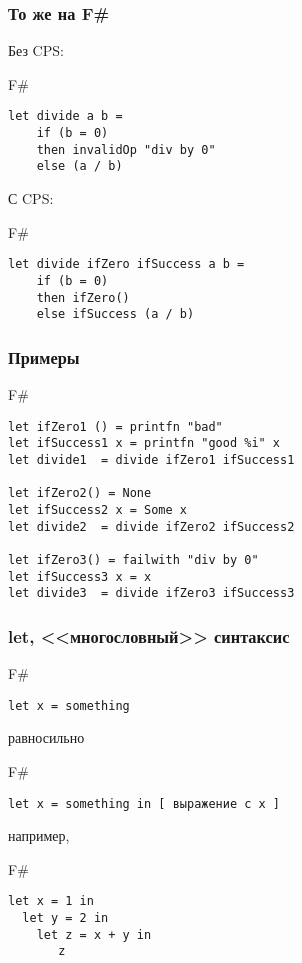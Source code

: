 \documentclass[xetex,mathserif,serif]{beamer}
\begin{document}
	\begin{frame}[fragile]
		\frametitle{То же на F\#}
		Без CPS:
   		\begin{exampleblock}{F\#}
   			\begin{lstlisting}
let divide a b =
    if (b = 0) 
    then invalidOp "div by 0"
    else (a / b)
\end{lstlisting}
\end{exampleblock}
        С CPS:
   		\begin{exampleblock}{F\#}
   			\begin{lstlisting}
let divide ifZero ifSuccess a b = 
    if (b = 0) 
    then ifZero()
    else ifSuccess (a / b)
\end{lstlisting}
\end{exampleblock}
\end{frame}

	\begin{frame}[fragile]
		\frametitle{Примеры}
   		\begin{exampleblock}{F\#}
   			\begin{lstlisting}
let ifZero1 () = printfn "bad"
let ifSuccess1 x = printfn "good %i" x
let divide1  = divide ifZero1 ifSuccess1

let ifZero2() = None
let ifSuccess2 x = Some x
let divide2  = divide ifZero2 ifSuccess2

let ifZero3() = failwith "div by 0"
let ifSuccess3 x = x
let divide3  = divide ifZero3 ifSuccess3
\end{lstlisting}
\end{exampleblock}
\end{frame}

	\begin{frame}[fragile]
		\frametitle{let, <<многословный>> синтаксис}
   		\begin{exampleblock}{F\#}
   			\begin{lstlisting}
let x = something
\end{lstlisting}
\end{exampleblock}
равносильно
   		\begin{exampleblock}{F\#}
   			\begin{lstlisting}
let x = something in [ выражение c x ]
\end{lstlisting}
\end{exampleblock}
например,
   		\begin{exampleblock}{F\#}
   			\begin{lstlisting}
let x = 1 in   
  let y = 2 in 
    let z = x + y in
       z    
\end{lstlisting}
\end{exampleblock}
\end{frame}
\end{document}
